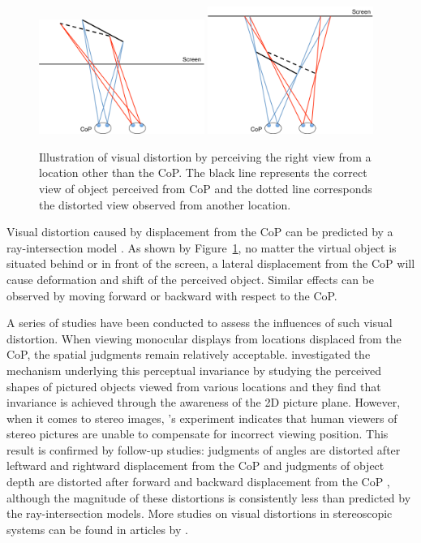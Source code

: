 \begin{figure}[htb]
  \centering
  \includegraphics[width=0.48\textwidth]{figures/ch2/distortion_1}
  \includegraphics[width=0.48\textwidth]{figures/ch2/distortion_2}
  \caption{\label{fig:2_ray_model}Illustration of visual distortion by perceiving the right view from a location other than the CoP. The black line represents the correct view of object perceived from CoP and the dotted line corresponds the distorted view observed from another location.}
\end{figure}


Visual distortion caused by displacement from the CoP can be predicted by a ray-intersection model \citep{Burton2012Diagnosing}. As shown by Figure~\ref{fig:2_ray_model}, no matter the virtual object is situated behind or in front of the screen, a lateral displacement from the CoP will cause deformation and shift of the perceived object. Similar effects can be observed by moving forward or backward with respect to the CoP.

A series of studies have been conducted to assess the influences of such visual distortion. When viewing monocular displays from locations displaced from the CoP, the spatial judgments remain relatively acceptable. \citet{Vishwanath2005Pictures} investigated the mechanism underlying this perceptual invariance by studying the perceived shapes of pictured objects viewed from various locations and they find that invariance is achieved through the awareness of the 2D picture plane. However, when it comes to stereo images, \citet{Banks2009Perception}'s experiment indicates that human viewers of stereo pictures are unable to compensate for incorrect viewing position. This result is confirmed by follow-up studies: judgments of angles are distorted after leftward and rightward displacement from the CoP \citep{Burton2012Diagnosing} and judgments of object depth are distorted after forward and backward displacement from the CoP \citep{Pollock2012Right}, although the magnitude of these distortions is consistently less than predicted by the ray-intersection models. More studies on visual distortions in stereoscopic systems can be found in articles by \citet{Woods1993Image, Held2008Misperceptions, Ponto2013Perceptual}.


